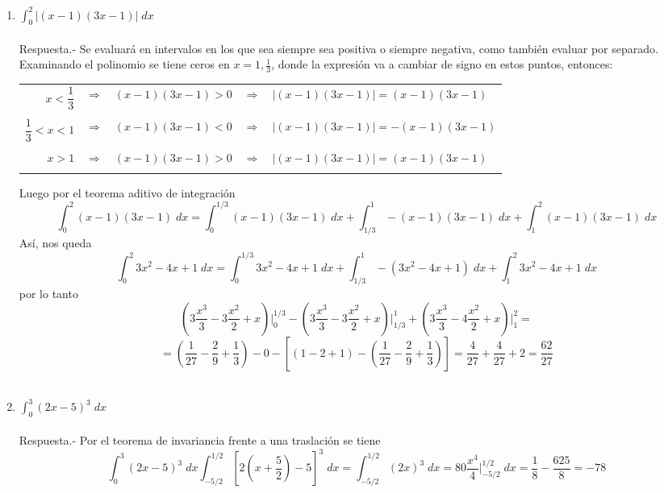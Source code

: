 \begin{enumerate}[\bfseries 1.]
    \item $\displaystyle\int_0^2 |(x-1)(3x-1)| \; dx$\\\\
	Respuesta.-\; Se evaluará en intervalos en los que sea siempre sea positiva o siempre negativa, como también evaluar por separado. Examinando el polinomio se tiene ceros en $x=1,\frac{1}{3}$, donde la expresión va a cambiar de signo en estos puntos, entonces:
	\begin{center}
	    \begin{tabular}{rcccl}
		$x<\dfrac{1}{3}$ & $\Longrightarrow$ & $(x-1)(3x-1)>0$ & $\Longrightarrow$ & $|(x-1)(3x-1)| = (x-1)(3x-1)$\\\\
		$\dfrac{1}{3}<x<1$ & $\Longrightarrow$ & $(x-1)(3x-1)<0$ & $\Longrightarrow$ & $|(x-1)(3x-1)| = -(x-1)(3x-1)$\\\\
		$x>1$ & $\Longrightarrow$ & $(x-1)(3x-1)>0$ & $\Longrightarrow$ & $|(x-1)(3x-1)| = (x-1)(3x-1)$\\\\
	    \end{tabular}
	\end{center}
	Luego por el teorema  aditivo de integración $$\int_0^2 (x-1)(3x-1)\; dx = \int_0^{1/3}(x-1)(3x-1)\; dx + \int_{1/3}^1 -(x-1)(3x-1)\; dx + \int_1^2 (x-1)(3x-1)\; dx$$
	Así, nos queda 
	$$\int_0^2 3x^2 - 4x + 1\; dx = \int_0^{1/3}3x^2 - 4x + 1\; dx + \int_{1/3}^1 -(3x^2 - 4x + 1)\; dx + \int_1^2 3x^2 - 4x + 1\; dx$$
	por lo tanto
	$$\left(3\dfrac{x^3}{3}-3\dfrac{x^2}{2}+x\right)\bigg|_0^{1/3} - \left(3\dfrac{x^3}{3}-3\dfrac{x^2}{2} + x\right)\bigg|_{1/3}^1 + \left(3\dfrac{x^3}{3} - 4\dfrac{x^2}{2} + x\right) \bigg|_1^2 = $$
	$$ = \left(\dfrac{1}{27}-\dfrac{2}{9}+\dfrac{1}{3}\right)-0 - \left[ (1-2+1)-\left(\dfrac{1}{27}-\dfrac{2}{9}+\dfrac{1}{3}\right)\right] = \dfrac{4}{27}+\dfrac{4}{27}+2=\dfrac{62}{27}$$\\

    \item $\displaystyle\int_0^3 (2x-5)^3 \; dx$\\\\
	Respuesta.-\; Por el teorema de invariancia frente a una traslación se tiene
	$$\int_0^3 (2x-5)^3 \; dx \int_{-5/2}^{1/2} \left[2\left(x+\dfrac{5}{2}\right)-5\right]^3 \; dx = \int_{-5/2}^{1/2} (2x)^3 \; dx = 80\dfrac{x^4}{4}\bigg|_{-5/2}^{1/2}\; dx = \dfrac{1}{8}-\dfrac{625}{8}=-78$$\\


\end{enumerate}
